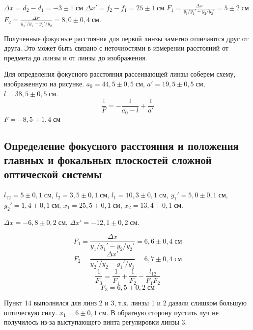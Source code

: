 $\Delta x = d_{2} - d_{1} = -3\pm 1\;\text{см}$
$\Delta x' = f_{2} - f_{1} = 25\pm 1\;\text{см}$
$F_{1} = \frac{\Delta x}{y_{1} / y_{1}' - y_{2}/y_{2}'} = 5\pm 2\;\text{см}$
$F_{2} = \frac{\Delta x'}{y_{1}' / y_{1} - y_{2}' / y_{2}} = 8{,}0 \pm 0{,}4\;\text{см}$.

Полученные фокусные расстояния для первой линзы заметно отличаются друг от друга. Это может быть связано с неточностями в измерении расстояний от предмета до линзы и от линзы до изображения.

\begin{figure}[ht!]
\end{figure}
Для определения фокусного расстояния рассеивающей линзы соберем схему, изображенную на рисунке.
$a_{0} = 44{,}5 \pm 0{,}5\;\text{см}$, $a' = 19{,}5 \pm 0{,}5 \;\text{см}$, $l = 38{,}5 \pm 0{,}5 \;\text{см}$.
\[
    \frac{1}{F} = -\frac{1}{a_{0} - l} + \frac{1}{a'}
\]
$F = -8{,}5 \pm 1{,}4\;\text{см}$

\subsection{Определение фокусного расстояния и положения главных и фокальных плоскостей сложной оптической системы}

$l_{12} = 5\pm 0{,}1\;\text{см}$, $l_{2} = 3{,}5 \pm 0{,}1\;\text{см}$, $l_{1} = 10{,}3 \pm 0{,}1 \;\text{см}$, $y_{1}' = 5,0 \pm 0{,}1\;\text{см}$, $y_{2}' = 1{,}4 \pm 0{,}1 \;\text{см}$, $x_{1} = 25{,}5 \pm 0{,}1 \;\text{см}$, $x_{2} = 13{,}4 \pm 0{,}1\;\text{см}$.

$\Delta x = -6{,}8 \pm 0{,}2 \;\text{см}$, $\Delta x' = -12{,}1 \pm 0{,}2 \;\text{см}$.

\[
    F_{1} = \frac{\Delta x}{y_{1} / y_{1}' - y_{2} / y_{2}'} =  6{,}6 \pm 0{,}4\;\text{см}
\]
\[
    F_{2} = \frac{\Delta x'}{y_{2}' / y_{2} - y_{1}' / y_{1}} = 6{,}7 \pm 0{,}4\;\text{см} 
\]
\[
    \frac{1}{F_{3}} = \frac{1}{F_{1}} + \frac{1}{F_{2}} - \frac{l_{12}}{F_{1}F_{2}}
\]
\[
    F_{3} = 6{,}5 \pm 0{,}2\;\text{см}
\]

Пункт 14 выполнялся для линз 2 и 3, т.к. линзы 1 и 2 давали слишком большую оптическую силу.
$x_{1} = 6 \pm 0{,}1\;\text{см}$.
В обратную сторону пустить луч не получилось из-за выступающего винта регулировки линзы 3.
